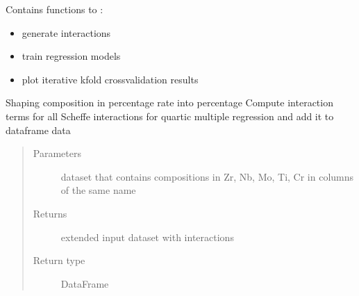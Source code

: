\documentclass[letterpaper,10pt,english]{sphinxmanual}
\begin{document}
\sphinxAtStartPar
Contains functions to :
\begin{itemize}
\item {} 
\sphinxAtStartPar
generate interactions

\item {} 
\sphinxAtStartPar
train regression models

\item {} 
\sphinxAtStartPar
plot iterative k\sphinxhyphen{}fold crossvalidation results

\end{itemize}

\begin{fulllineitems}
\label{\detokenize{MultipleRegression:MultipleRegression.Scheffe_interactions_terms}}
\sphinxAtStartPar
Shaping composition in percentage rate into percentage
Compute interaction terms for all Scheffe interactions for quartic multiple regression and add it to dataframe data
\begin{quote}\begin{description}
\item[{Parameters}] \leavevmode
\sphinxAtStartPar
{} \textendash{} dataset that contains compositions in Zr, Nb, Mo, Ti, Cr in columns of the same name

\item[{Returns}] \leavevmode
\sphinxAtStartPar
extended input dataset with interactions

\item[{Return type}] \leavevmode
\sphinxAtStartPar
DataFrame

\end{description}\end{quote}

\end{fulllineitems}
\end{document}
